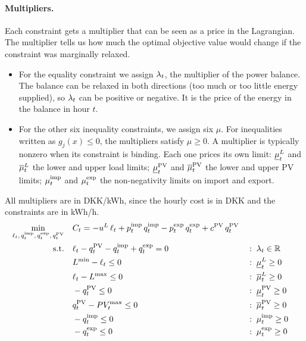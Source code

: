\paragraph{Multipliers.}

Each constraint gets a multiplier that can be seen as a price in the Lagrangian. The multiplier tells us how much the optimal objective value would change if the constraint was marginally relaxed. 

\begin{itemize}
    \item For the equality constraint we assign $\lambda_{t}$, the multiplier of the power balance. The balance can be relaxed
    in both directions (too much or too little energy supplied), so $\lambda_{t}$ can be positive or negative. It is the price of the energy in the balance in hour $t$.
    \item For the other six inequality constraints, we assign six $\mu$. For inequalities written as $g_j(x)\leq 0$, the multipliers satisfy $\mu \geq 0$. A multiplier is typically nonzero when its constraint is binding. Each one prices its own limit: $\underline{\mu}^{L}_{t}$ and $\overline{\mu}^{L}_{t}$ the lower and upper load limits; $\underline{\mu}^{\mathrm{PV}}_{t}$ and $\overline{\mu}^{\mathrm{PV}}_{t}$ the lower and upper PV limits; $\mu^{\mathrm{imp}}_{t}$ and $\mu^{\mathrm{exp}}_{t}$ the non-negativity limits on import and export.

    
\end{itemize}
All multipliers are in DKK/kWh, since the hourly cost is in DKK and the constraints are in kWh/h.
\begin{align}
    \min_{\ell_{t},\, q^{\mathrm{imp}}_{t},\, q^{\mathrm{exp}}_{t},\, q^{\mathrm{PV}}_{t}} \quad
    & C_t = -u^{L} \, \ell_{t} + p^{\mathrm{imp}}_{t} \, q^{\mathrm{imp}}_{t} - p^{\mathrm{exp}}_{t} \, q^{\mathrm{exp}}_{t} + c^{\mathrm{PV}} \, q^{\mathrm{PV}}_{t} \\
    \text{s.t.} \quad
    & \ell_{t} - q^{\mathrm{PV}}_{t} - q^{\mathrm{imp}}_{t} + q^{\mathrm{exp}}_{t} = 0
        & & : \; \lambda_{t} \in \mathbb{R} \label{eq:b_balance} \\
    & L^{\min} - \ell_{t} \leq 0
        & & : \; \underline{\mu}^{L}_{t} \geq 0 \label{eq:b_load_lo} \\
    & \ell_{t} - L^{\max} \leq 0
        & & : \; \overline{\mu}^{L}_{t} \geq 0 \label{eq:b_load_up} \\
    & -q^{\mathrm{PV}}_{t} \leq 0
        & & : \; \underline{\mu}^{\mathrm{PV}}_{t} \geq 0 \label{eq:b_pv_lo} \\
    & q^{\mathrm{PV}}_{t} - PV_{t}^{\max} \leq 0
        & & : \; \overline{\mu}^{\mathrm{PV}}_{t} \geq 0 \label{eq:b_pv_up} \\
    & -q^{\mathrm{imp}}_{t} \leq 0
        & & : \; \mu^{\mathrm{imp}}_{t} \geq 0 \label{eq:b_imp} \\
    & -q^{\mathrm{exp}}_{t} \leq 0
        & & : \; \mu^{\mathrm{exp}}_{t} \geq 0 \label{eq:b_exp}
\end{align}

